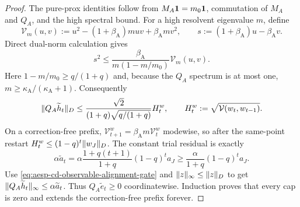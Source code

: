 \begin{proof}
The pure-prox identities follow from $M_A\mathbf{1}=m_0\mathbf{1}$, commutation of
$M_A$ and $Q_A$, and the high spectral bound.  For a high resolvent
eigenvalue $m$, define
\begin{equation*}
 \mathcal V_m(u,v)
 :=u^2-(1+\beta_{\mathrm A})muv+\beta_{\mathrm A}mv^2,
 \qquad s:=(1+\beta_{\mathrm A})u-\beta_{\mathrm A}v.
\end{equation*}
Direct dual-norm calculation gives
\begin{equation*}
 s^2\leq
 \frac{\beta_{\mathrm A}}{m(1-m/m_0)}\mathcal V_m(u,v).
\end{equation*}
Here $1-m/m_0\geq q/(1+q)$ and, because the $Q_A$ spectrum is at most one,
$m\geq\kappa_{\mathrm A}/(\kappa_{\mathrm A}+1)$.  Consequently
\begin{equation*}
 \lVert Q_A\widetilde h_t\rVert_D
 \leq\frac{\sqrt2}{(1+q)\sqrt{q/(1+q)}}H_t^w,
 \qquad
 H_t^w:=\sqrt{\mathcal V(w_t,w_{t-1})}.
\end{equation*}
On a correction-free prefix,
$\mathcal V_{t+1}^w=\beta_{\mathrm A}m\mathcal V_t^w$ modewise, so after
the same-point restart $H_t^w\leq(1-q)^t\lVert w_J\rVert_D$.
The constant trial residual is exactly
\begin{equation*}
 \alpha\widetilde a_t
 =\alpha\frac{1+q(t+1)}{1+q}(1-q)^ta_J
 \geq\frac{\alpha}{1+q}(1-q)^ta_J.
\end{equation*}
Use \cref{eq:aesp-cd-observable-alignment-gate} and
$\lVert z\rVert_\infty\leq\lVert z\rVert_D$ to get
$\lVert Q_A\widetilde h_t\rVert_\infty\leq\alpha\widetilde a_t$.
Thus $Q_A\widetilde e_t\geq0$ coordinatewise.  Induction proves that every
cap is zero and extends the correction-free prefix forever.
\end{proof}

